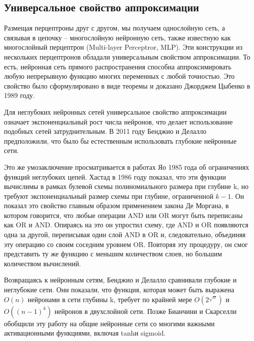 \subsection{Универсальное свойство аппроксимации}
Размещая перцептроны друг с другом, мы получаем однослойную сеть, а связывая в цепочку – многослойную нейронную сеть, также известную как многослойный перцептрон (Multi-layer Perceptror, MLP). Эти конструкции из нескольких перцептронов обладали универсальным свойством аппроксимации. То есть, нейронная сеть прямого распространения способна аппроксимировать любую непрерывную функцию многих переменных с любой точностью. Это свойство было сформулировано в виде теоремы и доказано  Джорджем Цыбенко в 1989 году.
\par
Для неглубоких нейронных сетей универсальное свойство аппроксимации означает экспоненциальный рост числа нейронов, что делает использование подобных сетей затруднительным. В 2011 году Бенджио и Делалло  предположили, что было бы естественным использовать глубокие нейронные сети.
\par
Это же умозаключение просматривается в работах Яо 1985 года об ограничениях функций неглубоких цепей. Хастад в 1986 году показал, что эти функции вычислимы в рамках булевой схемы полиномиального размера      при глубине k, но требуют экспоненциальный размер схемы при глубине, ограниченной $k-1$. Он показал это свойство главным образом применением закона Де Моргана, в котором говорится, что любые операции AND или OR могут быть переписаны как OR и AND. Опираясь на это он упростил схему, где AND и OR появляются одна за другой, переписывая один слой AND в OR и, следовательно, объединяя эту операцию со своим соседним уровнем OR. Повторяя эту процедуру, он смог представить ту же функцию с меньшим количеством слоев, но большим количеством вычислений.
\par
Возвращаясь к нейронным сетям, Бенджио и Делалло сравнивали глубокие и неглубокие сети. Они показали, что функция, которая может быть выражена $O(n)$ нейронами в сети глубины k, требует по крайней мере $O(2^{\sqrt{n}})$ и $O((n-1)^k)$ нейронов в двухслойной сети. Позже Бианчини и Скарселли обобщили эту работу на общие нейронные сети со многими важными активационными функциями, включая tanhи sigmoid.
